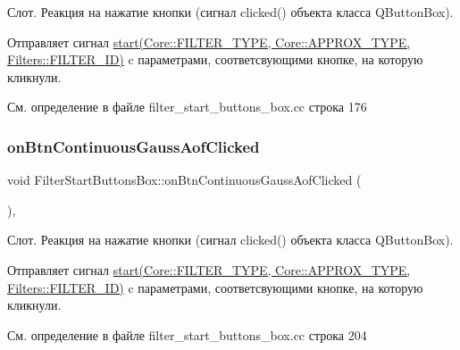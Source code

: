 Слот. Реакция на нажатие кнопки (сигнал clicked() объекта класса Q\+Button\+Box).

Отправляет сигнал \hyperlink{class_filter_start_buttons_box_ac6e2a6555f1d388391f188f834b8e753}{start(\+Core\+::\+F\+I\+L\+T\+E\+R\+\_\+\+T\+Y\+P\+E, Core\+::\+A\+P\+P\+R\+O\+X\+\_\+\+T\+Y\+P\+E, Filters\+::\+F\+I\+L\+T\+E\+R\+\_\+\+I\+D)} c параметрами, соответсвующими кнопке, на которую кликнули. 

См. определение в файле filter\+\_\+start\+\_\+buttons\+\_\+box.\+cc строка 176

\hypertarget{class_filter_start_buttons_box_a41f3677ea143b683d6e7d78657c9d794}{}\label{class_filter_start_buttons_box_a41f3677ea143b683d6e7d78657c9d794} 
\subsubsection{\texorpdfstring{on\+Btn\+Continuous\+Gauss\+Aof\+Clicked}{onBtnContinuousGaussAofClicked}}
{\footnotesize\ttfamily void Filter\+Start\+Buttons\+Box\+::on\+Btn\+Continuous\+Gauss\+Aof\+Clicked (\begin{DoxyParamCaption}{ }\end{DoxyParamCaption})\hspace{0.3cm}{\ttfamily [private]}, {\ttfamily [slot]}}

Слот. Реакция на нажатие кнопки (сигнал clicked() объекта класса Q\+Button\+Box).

Отправляет сигнал \hyperlink{class_filter_start_buttons_box_ac6e2a6555f1d388391f188f834b8e753}{start(\+Core\+::\+F\+I\+L\+T\+E\+R\+\_\+\+T\+Y\+P\+E, Core\+::\+A\+P\+P\+R\+O\+X\+\_\+\+T\+Y\+P\+E, Filters\+::\+F\+I\+L\+T\+E\+R\+\_\+\+I\+D)} c параметрами, соответсвующими кнопке, на которую кликнули. 

См. определение в файле filter\+\_\+start\+\_\+buttons\+\_\+box.\+cc строка 204

\hypertarget{class_filter_start_buttons_box_a357e28766d55a027f4bf29f9f7e6e288}{}\label{class_filter_start_buttons_box_a357e28766d55a027f4bf29f9f7e6e288} 
